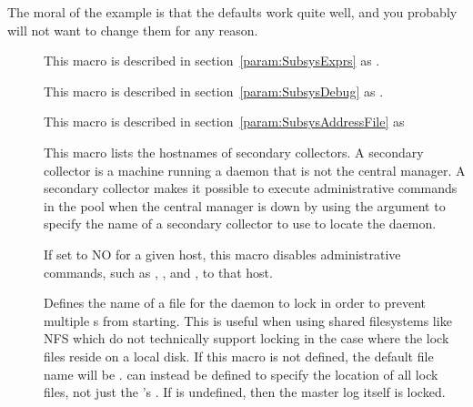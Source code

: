 The moral of the example is that 
the defaults work quite well, and you probably 
will not want to change them for any reason.
\begin{description}

\item[] \label{param:MasterExprs} This macro is
  described in section~\ref{param:SubsysExprs} as
  .

\item[] \label{param:MasterDebug} This macro
  is described in section~\ref{param:SubsysDebug} as
  .

\item[] \label{param:MasterAddressFile}
  This macro is described in
  section~\ref{param:SubsysAddressFile} as

\item[]
  \label{param:SecondaryCollectorList} This macro lists the hostnames
  of secondary collectors.  A secondary collector is a machine
  running a  daemon that is not the central manager.
  A secondary collector makes it possible to execute administrative
  commands in the pool when the central manager is down by using the
   argument to specify the name of a secondary collector to
  use to locate the  daemon.

\item[]
  \label{param:AllowAdminCommands} If set to NO for a given host, this
  macro disables administrative commands, such as 
  , , and , to that host.

\item[] \label{param:MasterInstanceLock}
  Defines the name of a file for the  daemon
  to lock in order to prevent multiple s
  from starting.
  This is useful when using shared filesystems like NFS which do
  not technically support locking in the case where the lock files
  reside on a local disk.
  If this macro is not defined, the default file name will be
  .
   can instead be defined to
  specify the location of all lock files, not just the 
  's .
  If  is undefined, then the master log itself is locked.


\end{description}

